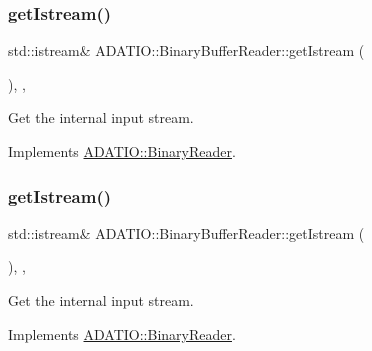 \subsubsection{\texorpdfstring{getIstream()}{getIstream()}\hspace{0.1cm}{\footnotesize\ttfamily [1/3]}}
{\footnotesize\ttfamily std\+::istream\& A\+D\+A\+T\+I\+O\+::\+Binary\+Buffer\+Reader\+::get\+Istream (\begin{DoxyParamCaption}{ }\end{DoxyParamCaption})\hspace{0.3cm}{\ttfamily [inline]}, {\ttfamily [protected]}, {\ttfamily [virtual]}}



Get the internal input stream. 



Implements \mbox{\hyperlink{classADATIO_1_1BinaryReader_aa34e73d5f1e6b2b3b48c27e97f6a85a0}{A\+D\+A\+T\+I\+O\+::\+Binary\+Reader}}.

\mbox{\label{classADATIO_1_1BinaryBufferReader_a32d746446a4c990f3c592a32753d7207}} 
\subsubsection{\texorpdfstring{getIstream()}{getIstream()}\hspace{0.1cm}{\footnotesize\ttfamily [2/3]}}
{\footnotesize\ttfamily std\+::istream\& A\+D\+A\+T\+I\+O\+::\+Binary\+Buffer\+Reader\+::get\+Istream (\begin{DoxyParamCaption}{ }\end{DoxyParamCaption})\hspace{0.3cm}{\ttfamily [inline]}, {\ttfamily [protected]}, {\ttfamily [virtual]}}



Get the internal input stream. 



Implements \mbox{\hyperlink{classADATIO_1_1BinaryReader_aa34e73d5f1e6b2b3b48c27e97f6a85a0}{A\+D\+A\+T\+I\+O\+::\+Binary\+Reader}}.

\mbox{\label{classADATIO_1_1BinaryBufferReader_a32d746446a4c990f3c592a32753d7207}} 
